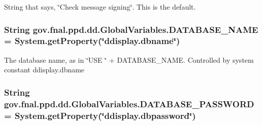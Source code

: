 String that says, \char`\"{}\-Check message signing\char`\"{}. This is the default. \hypertarget{classgov_1_1fnal_1_1ppd_1_1dd_1_1GlobalVariables_a737045676a15c469e5cb486d80c08043}{
\subsubsection[{D\-A\-T\-A\-B\-A\-S\-E\-\_\-\-N\-A\-M\-E}]{\setlength{\rightskip}{0pt plus 5cm}String gov.\-fnal.\-ppd.\-dd.\-Global\-Variables.\-D\-A\-T\-A\-B\-A\-S\-E\-\_\-\-N\-A\-M\-E = System.\-get\-Property(\char`\"{}ddisplay.\-dbname\char`\"{})\hspace{0.3cm}{\ttfamily [static]}}}\label{classgov_1_1fnal_1_1ppd_1_1dd_1_1GlobalVariables_a737045676a15c469e5cb486d80c08043}
The database name, as in \char`\"{}\-U\-S\-E \char`\"{} + D\-A\-T\-A\-B\-A\-S\-E\-\_\-\-N\-A\-M\-E. Controlled by system constant ddisplay.\-dbname \hypertarget{classgov_1_1fnal_1_1ppd_1_1dd_1_1GlobalVariables_ae63bd973c9c02683b0c4964179ceefe0}{
\subsubsection[{D\-A\-T\-A\-B\-A\-S\-E\-\_\-\-P\-A\-S\-S\-W\-O\-R\-D}]{\setlength{\rightskip}{0pt plus 5cm}String gov.\-fnal.\-ppd.\-dd.\-Global\-Variables.\-D\-A\-T\-A\-B\-A\-S\-E\-\_\-\-P\-A\-S\-S\-W\-O\-R\-D = System.\-get\-Property(\char`\"{}ddisplay.\-dbpassword\char`\"{})\hspace{0.3cm}{\ttfamily [static]}}}\label{classgov_1_1fnal_1_1ppd_1_1dd_1_1GlobalVariables_ae63bd973c9c02683b0c4964179ceefe0}
